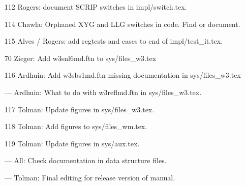 \begin{itemize}
\item[112] Rogers: document SCRIP switches in impl/switch.tex.


\item[114] Chawla: Orphaned XYG and LLG switches in code. Find or document.

\item[115] Alves / Rogers: add regtests and cases to end of impl/test\_it.tex.

\item[70] Zieger: Add w3snl6md.ftn to sys/files\_w3.tex

\item[116] Ardhuin: Add w3sbs1md.ftn missing documentation in sys/files\_w3.tex

\item[---] Ardhuin: What to do with w3reflmd.ftn in sys/files\_w3.tex.

\item[117] Tolman: Update figures in sys/files\_w3.tex.

\item[118] Tolman: Add figures to sys/files\_wm.tex.

\item[119] Tolman: Update figures in sys/aux.tex.


\item[---] All: Check documentation in data structure files.

\item[---] Tolman: Final editing for release version of manual.

\end{itemize}

\bpage
\pagestyle{empty}
